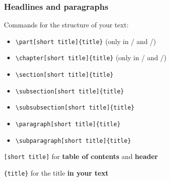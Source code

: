 \begin{frame}[fragile]
\frametitle{Headlines and paragraphs}

\noindent Commands for the structure of your text:

\begin{itemize}
	\item \lstinline|\part[short title]{title}|  \hfill (only in  / and /)
	
	\item \lstinline|\chapter[short title]{title}| \hfill (only in  / and /)
		
	\item \lstinline|\section[short title]{title}|
	
	\item \lstinline|\subsection[short title]{title}| 
	
	\item \lstinline|\subsubsection[short title]{title}| 
	
	\item \lstinline|\paragraph[short title]{title}|
	
	\item \lstinline|\subparagraph[short title]{title}|
\end{itemize}

\noindent \lstinline|[short title]| for \textbf{table of contents} and \textbf{header}

\vspace{.3cm}

\noindent \lstinline|{title}| for the title \textbf{in your text}

\end{frame}


